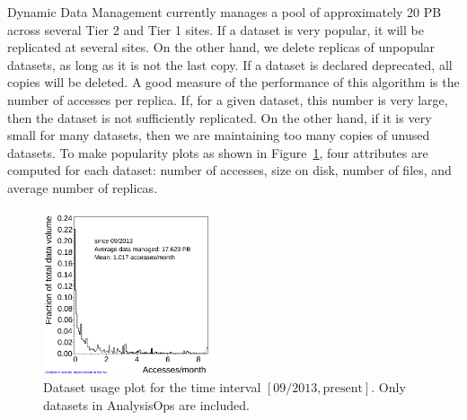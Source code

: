 Dynamic Data Management currently manages a pool of approximately 20 PB across several Tier 2 and Tier 1 sites. If a dataset is very popular, it will be replicated at several sites. On the other hand, we delete replicas of unpopular datasets, as long as it is not the last copy. If a dataset is declared deprecated, all copies will be deleted.  A good measure of the performance of this algorithm is the number of accesses per replica. If, for a given dataset, this number is very large, then the dataset is not sufficiently replicated. On the other hand, if it is very small for many datasets, then we are maintaining too many copies of unused datasets. To make popularity plots as shown in Figure~\ref{fig:usage}, four attributes are computed for each dataset: number of accesses, size on disk, number of files, and average number of replicas.

\begin{figure}[htbp]
    \centering
    \includegraphics[width=0.45\textwidth]{plots/analysisOps_usage.png}
    \caption{Dataset usage plot for the time interval $[09/2013,\text{present}]$. Only datasets in AnalysisOps are included.}
    \label{fig:usage}
\end{figure}



